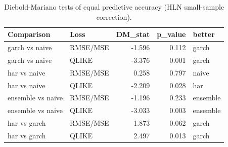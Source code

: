 \begin{table}[htbp]
\centering
\caption{Diebold-Mariano tests of equal predictive accuracy (HLN small-sample correction).}
\label{tab:dm}
\small
\begin{tabular}{llrrl}
\toprule
Comparison & Loss & DM\_stat & p\_value & better \\
\midrule
garch vs naive & RMSE/MSE & -1.596 & 0.112 & garch \\
garch vs naive & QLIKE & -3.376 & 0.001 & garch \\
har vs naive & RMSE/MSE & 0.258 & 0.797 & naive \\
har vs naive & QLIKE & -2.209 & 0.028 & har \\
ensemble vs naive & RMSE/MSE & -1.196 & 0.233 & ensemble \\
ensemble vs naive & QLIKE & -3.033 & 0.003 & ensemble \\
har vs garch & RMSE/MSE & 1.873 & 0.062 & garch \\
har vs garch & QLIKE & 2.497 & 0.013 & garch \\
\bottomrule
\end{tabular}
\end{table}
